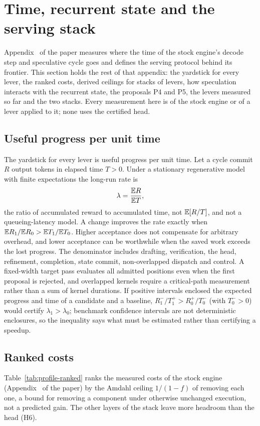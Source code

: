 \section{Time, recurrent state and the serving stack}\label{notes:stack}
Appendix~ of the paper measures where the time of the stock engine's decode step and speculative cycle goes and defines the serving protocol behind its frontier. This section holds the rest of that appendix: the yardstick for every lever, the ranked costs, derived ceilings for stacks of levers, how speculation interacts with the recurrent state, the proposals P4 and P5, the levers measured so far and the two stacks. Every measurement here is of the stock engine or of a lever applied to it; none uses the certified head.

\subsection{Useful progress per unit time}\label{notes:rate}
The yardstick for every lever is useful progress per unit time.\label{sec:rate} Let a cycle commit $R$ output tokens in elapsed time $T>0$. Under a stationary regenerative model with finite expectations the long-run rate is
\begin{equation}\lambda=\frac{\mathbb E R}{\mathbb E T},\label{eq:rate}\end{equation}
the ratio of accumulated reward to accumulated time, not $\mathbb E[R/T]$, and not a queueing-latency model. A change improves the rate exactly when $\mathbb E R_1/\mathbb E R_0>\mathbb E T_1/\mathbb E T_0$. Higher acceptance does not compensate for arbitrary overhead, and lower acceptance can be worthwhile when the saved work exceeds the lost progress. The denominator includes drafting, verification, the head, refinement, completion, state commit, non-overlapped dispatch and control. A fixed-width target pass evaluates all admitted positions even when the first proposal is rejected, and overlapped kernels require a critical-path measurement rather than a sum of kernel durations. If positive intervals enclosed the expected progress and time of a candidate and a baseline, $R_1^-/T_1^+>R_0^+/T_0^-$ (with $T_0^->0$) would certify $\lambda_1>\lambda_0$; benchmark confidence intervals are not deterministic enclosures, so the inequality says what must be estimated rather than certifying a speedup.

\subsection{Ranked costs}\label{notes:ranked}
Table~\ref{tab:profile-ranked} ranks the measured costs of the stock engine (Appendix~ of the paper) by the Amdahl ceiling $1/(1-f)$ of removing each one, a bound for removing a component under otherwise unchanged execution, not a predicted gain. The other layers of the stack leave more headroom than the head (H6).

